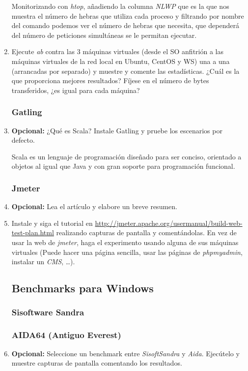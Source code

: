 \documentclass[paper=a4, fontsize=11pt]{scrartcl} %
\numberwithin{equation}{section} %
\numberwithin{figure}{section} %
\numberwithin{table}{section} %
\begin{document}
\begin{enumerate}
		Monitorizando con \textit{htop}\cite{man_htop}, añadiendo la columna \textit{NLWP} que es la
		que nos muestra el número de hebras que utiliza cada proceso y filtrando por nombre del comando
		podemos ver el número de hebras que necesita, que dependerá del número de peticiones simultáneas
		se le permitan ejecutar.
		
		\item Ejecute \textit{ab} contra las 3 máquinas virtuales (desde el SO anfitrión a las máquinas
		virtuales de la red local en Ubuntu, CentOS y WS) una a una (arrancadas por separado) y muestre
		y comente las estadísticas. ¿Cuál es la que proporciona mejores resultados? Fíjese en el número
		de bytes transferidos, ¿es igual para cada máquina?
		
	\subsubsection{Gatling}
		\item \textbf{Opcional:} ¿Qué es Scala? Instale Gatling y pruebe los escenarios por defecto.
		
		Scala\cite{Scala} es un lenguaje de programación diseñado para ser conciso, orientado a objetos
		al igual que Java y con gran soporte para programación funcional.
		
	\subsubsection{Jmeter}
		\item \textbf{Opcional:} Lea el artículo y elabore un breve resumen.
		
		\item Instale y siga el tutorial en \url{http://jmeter.apache.org/usermanual/build-web-test-plan.html}
		realizando capturas de pantalla y comentándolas. En vez de usar la web de \textit{jmeter},
		haga el experimento usando alguna de sus máquinas virtuales (Puede hacer una página sencilla,
		usar las páginas de \textit{phpmyadmin}, instalar un \textit{CMS}, \dots).
		
	\subsection{Benchmarks para Windows}
	\subsubsection{Sisoftware Sandra}
	\subsubsection{AIDA64 (Antiguo Everest)}
		\item \textbf{Opcional:} Seleccione un benchmark entre \textit{SisoftSandra} y \textit{Aida}.
		Ejecútelo y muestre capturas de pantalla comentando los resultados.
		

\end{enumerate}
\end{document}
